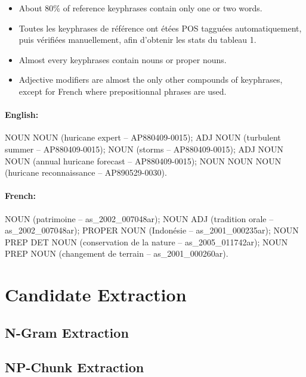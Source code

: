     \begin{itemize}
      \item{About 80\% of reference keyphrases contain only one or two words.}
      \item{Toutes les keyphrases de référence ont étées POS tagguées
            automatiquement, puis vérifiées manuellement, afin d'obtenir les
            stats du tableau 1.}
      \item{Almost every keyphrases contain nouns or proper nouns.}
      \item{Adjective modifiers are almost the only other compounds of
            keyphrases, except for French where prepositionnal phrases are
            used.}
    \end{itemize}
    \paragraph{English:} NOUN NOUN (huricane expert -- AP880409-0015); ADJ NOUN
    (turbulent summer -- AP880409-0015); NOUN (storms -- AP880409-0015); ADJ
    NOUN NOUN (annual huricane forecast -- AP880409-0015); NOUN NOUN NOUN
    (huricane reconnaissance -- AP890529-0030).
    \paragraph{French:} NOUN (patrimoine -- as\_2002\_007048ar); NOUN ADJ
    (tradition orale -- as\_2002\_007048ar); PROPER NOUN (Indonésie --
    as\_2001\_000235ar); NOUN PREP DET NOUN (conservation de la nature --
    as\_2005\_011742ar); NOUN PREP NOUN (changement de terrain --
    as\_2001\_000260ar).

\section{Candidate Extraction}
\label{sec:candidate_extraction}

  \subsection{N-Gram Extraction}
  \label{subsec:n_gram_extraction}

  \subsection{NP-Chunk Extraction}
  \label{subsec:np_chunk_extraction}
